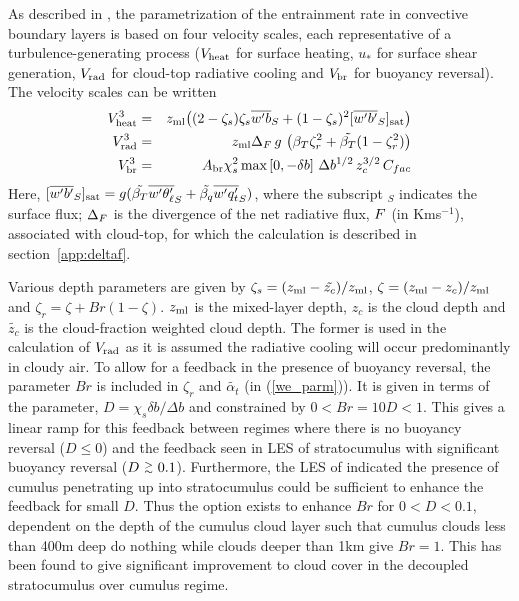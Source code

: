 \documentclass{UMDP_article}
\def\gtapp{\raisebox{-.4ex}{$\ \stackrel{>}{{\scriptstyle \sim}} \ $}}
\begin{document}
As described in \cite{lock00}, the parametrization of the entrainment
rate in convective boundary layers is based on four velocity scales,
each representative of a turbulence-generating process ($V_{\rm heat}$ for
surface heating, $u_*$ for surface shear generation, $V_{\rm rad}$ for
cloud-top radiative cooling and $V_{\rm br}$ for buoyancy reversal).  The
velocity scales can be written
\begin{eqnarray}
  V_{\rm heat}^3 &=& z_{\rm ml} \! \left( (2-\zeta_s)\zeta_s \overline{w'b}_S + (1-\zeta_s)^2 [\overline{w'b'}_S]_{\rm sat} \right)
  \label{vsurf} \\
  V_{\rm rad}^3 &=& z_{\rm ml} \Delta_F \, g \,
  \left( \beta_T \zeta_r^2 + \tilde{\beta_T} (1-\zeta_r^2) \right)
  \label{vrad} \\
  V_{\rm br}^3 &=&  A_{\rm br} \chi_s^2 \, \mbox{max}\left[0,-\delta b\right] \, \Delta b ^{1/2}
  \, z_c^{3/2} \, C_{fac} \label{vbr}
\end{eqnarray}
Here, $[\overline{w'b'}_S]_{\rm sat} = g ( \tilde{\beta_T} \overline{w'\theta_{\ell}'}_S + \tilde{\beta_q}\overline{w'q_t'}_S )$,
where the subscript $_S$ indicates the surface flux; $\Delta_F$ is
the divergence of the net radiative flux, $F$ (in Kms$^{-1}$),
associated with cloud-top, for which the calculation is described in
section~\ref{app:deltaf}.

Various depth parameters are given by $\zeta_s =
(z_{\rm ml}-\tilde{z_c})/z_{\rm ml} $, $\zeta = (z_{\rm ml}-z_c)/z_{\rm ml} $ and $ \zeta_r =
\zeta + Br (1-\zeta) $.  $z_{\rm ml}$ is the mixed-layer depth, $z_c$ is the
cloud depth and $\tilde{z_c}$ is the cloud-fraction weighted cloud
depth.  The former is used in the calculation of $V_{\rm rad}$ as it is
assumed the radiative cooling will occur predominantly in cloudy air.
To allow for a feedback in the presence of buoyancy reversal, the
parameter $Br$ is included in $ \zeta_r $ and $\tilde{\alpha_t} $ (in
(\ref{we_parm})).  It is given in terms of the \cite{siems1990}
parameter, $D = \chi_s \delta b/\Delta b $ and constrained by $0< Br =
10 D < 1$.  This gives a linear ramp for this feedback between regimes
where there is no buoyancy reversal ($D \leq 0$) and the feedback seen
in LES of stratocumulus \cite[]{lock98} with significant buoyancy
reversal ($D \gtapp 0.1$).  Furthermore, the LES of
\cite{lock09:_factor} indicated the presence of cumulus penetrating up
into stratocumulus could be sufficient to enhance the feedback for
small $D$.  Thus the option exists to enhance $Br$ for $0<D<0.1$,
dependent on the depth of the cumulus cloud layer such that cumulus
clouds less than 400m deep do nothing while clouds deeper than 1km
give $Br=1$.  This has been found to give significant improvement to
cloud cover in the decoupled stratocumulus over cumulus regime.
\end{document}
